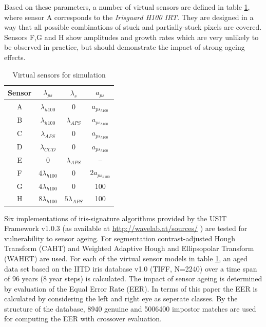 \documentclass[10pt,twocolumn,letterpaper]{article}
\begin{document}
\egroup

 Based on these parameters, a number of virtual sensors are defined in table \ref{table:tests}, where sensor A corresponds to the \emph{Irisguard H100 IRT}. They are designed in a way that all possible combinations of stuck and partially-stuck pixels are covered. Sensors F,G and H show amplitudes and growth rates which are very unlikely to be observed in practice, but should demonstrate the impact of strong ageing effects. 
 
 \begin{table}[bt]  
  \begin{center}
  \begin{tabular}{c | c c c }
  Sensor & $\lambda_{ps}$ & $\lambda_{s}$ & $a_{ps}$  \\
  \hline
  A	&	$\lambda_{h100}$ & 0 & $a_{ps_{h100}}$ \\
  B & $\lambda_{h100}$ & $\lambda_{APS}$ & $a_{ps_{h100}}$ \\
  C & $\lambda_{APS}$ & 0 & $a_{ps_{h100}}$    \\
  D & $\lambda_{CCD}$ & 0 & $a_{ps_{h100}}$   \\
  E & 0 & $\lambda_{APS}$ & -- \\
  F & $ 4 \lambda_{h100}$ & 0 & $ 2 a_{ps_{h100}}$ \\
  G & $ 4 \lambda_{h100}$ & 0 & 100 \\
  H & $ 8 \lambda_{h100}$ &  $ 5 \lambda_{APS}$ & 100

  \end{tabular}
    
    \vspace{3mm}
    \caption{Virtual sensors for simulation}
    \label{table:tests}
  \end{center}
 \end{table}
  
  Six implementations 
  of iris-signature algorithms provided by the USIT Framework v1.0.3 (as available at \url{http://wavelab.at/sources/} \cite{rathgeb}) are tested for vulnerability to sensor ageing. For segmentation contrast-adjusted Hough Transform (CAHT) and Weighted Adaptive Hough and Ellipsopolar Transform (WAHET) are used. For each of the virtual sensor models in table \ref{table:tests}, an aged data set based on the IITD iris database v1.0 (TIFF, N=2240) \cite{IITD} over a time span of 96 years (8 year steps) is calculated. The impact of sensor ageing is determined by evaluation of the Equal Error Rate (EER). In terms of this paper the EER is calculated by considering the left and right eye as seperate classes. By the structure of the database, 8940 genuine and 5006400 impostor matches are used for computing the EER with crossover evaluation.
  
\end{document}
